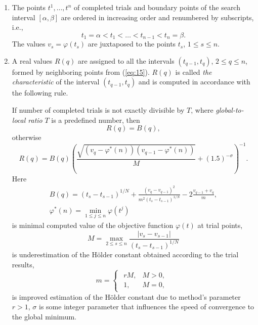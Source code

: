 \documentclass[]{interact}
\theoremstyle{plain}%
\theoremstyle{definition}
\theoremstyle{remark}
\begin{document}
\begin{enumerate}
\item 
The points $t^1, \dots, t^n$ of completed trials and boundary points of the search interval $[\alpha, \beta]$ are ordered in increasing order and renumbered by subscripts, i.e.,
\begin{equation}\label{eq:15}
t_1 = \alpha < t_1 < \dots < t_{n-1} < t_n = \beta.
\end{equation}
The values $v_s = \varphi(t_s)$ are juxtaposed to the points  $t_s$, $1 \leq s \leq n$.
\item 
A real values $R(q)$ are assigned to all the intervals $(t_{q-1}, t_q)$, $2 \leq q \leq n$, formed by neighboring points from (\ref{eq:15}). $R(q)$ is called \textit{the characteristic} of the interval $(t_{q-1}, t_q)$ and is computed in accordance with the following rule.

If number of completed trials is not exactly divisible by $T$, where \textit{global-to-local ratio} $T$ is a predefined number, then
\begin{equation}\label{eq:16}
R(q) = B(q),
\end{equation}
otherwise
\begin{equation}\label{eq:17}
R(q) = B(q)\left( \frac {\sqrt{(v_q - \varphi^*(n))(v_{q-1} - \varphi^*(n))}}{M} +(1.5)^{-\sigma}\right)^{-1}.
\end{equation}
Here
\begin{gather}\label{eq:18}
B(q) = (t_s - t_{s-1})^{1/N} + \frac{(v_q - v_{q-1})^2} {m^2 (t_s - t_{s-1})^{1/N}} -2\frac{v_{q-1} + v_q}{m},\\
\varphi^*(n) = \min_{1\leq j \leq n} {\varphi(t^j)}
\end{gather}
is minimal computed value of the objective function $\varphi(t)$ at trial points,
\begin{equation}\label{eq:19}
M = \max_{2 \leq  s \leq n} { \frac{|v_s - v_{s-1}|}{(t_s - t_{s-1})^{1/N}} }
\end{equation}
is underestimation of the H{\"o}lder constant obtained according to the trial results,
\begin{equation}\label{eq:20}
m = 
\begin{cases}
\begin{matrix}
rM, & M>0, \\
1, & M= 0,
\end{matrix}
\end{cases}
\end{equation}
is improved estimation of the H{\"o}lder constant due to method's parameter $r>1$, $\sigma$ is some integer parameter that influences the speed of convergence to the global minimum.


\end{enumerate}
\end{document}
